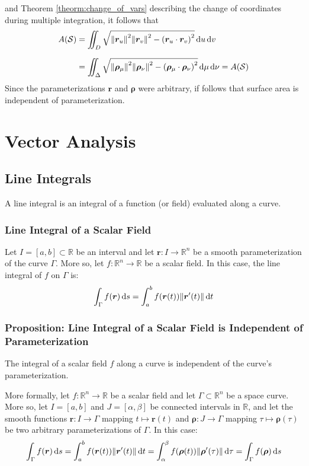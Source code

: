\documentclass[11pt, a4paper]{article}
\newcommand{\diff}{\mathop{}\!\mathrm{d}} %
\begin{document}
and Theorem \ref{theorm:change_of_vars} describing the change of coordinates during multiple integration, it follows that
\begin{align*}
	A(\mathcal{S}) &= \iint_D \sqrt{\norm{\bm{r}_u}^2 \norm{\bm{r}_v}^2 - \left(\bm{r}_u \cdot \bm{r}_v\right)^2} \diff u \diff v \\[1.5ex]
 &=  \iint_\Delta \sqrt{\norm{\bm{\rho}_\mu}^2 \norm{\bm{\rho}_\nu}^2 - \left(\bm{\rho}_\mu \cdot \bm{\rho}_\nu\right)^2} \diff \mu \diff \nu =	A(\mathcal{S})
\end{align*}
Since the parameterizations $ \bm{r} $ and $ \bm{\rho} $ were arbitrary, if follows that surface area is independent of parameterization.
\newpage 
\section{Vector Analysis}

\subsection{Line Integrals}
A line integral is an integral of a function (or field) evaluated along a curve.
	
\subsubsection{Line Integral of a Scalar Field}
Let $ I = [a, b] \subset \mathbb{R} $ be an interval and let $ \bm{r} : I \rightarrow \mathbb{R}^n $ be a smooth parameterization of the curve $ \Gamma $. More so, let $ f : \mathbb{R}^n \rightarrow \mathbb{R} $ be a scalar field. In this case, the line integral of $ f $ on $ \Gamma $ is:
\begin{equation*}
	\int_\Gamma f(\bm{r}) \diff s = \int_{a}^{b} f(\bm{r}(t)) \norm{\bm{r}'(t)} \diff t
\end{equation*}

\subsubsection{Proposition: Line Integral of a Scalar Field is Independent of Parameterization}
The integral of a scalar field $ f $ along a curve is independent of the curve's parameterization. 

More formally, let $ f : \mathbb{R}^n \rightarrow \mathbb{R} $ be a scalar field and let $ \Gamma \subset \mathbb{R}^n$ be a space curve. More so, let $ I = [a, b] $ and $ J = [\alpha, \beta]$ be connected intervals in $ \mathbb{R} $, and let the smooth functions $ \bm{r} : I \rightarrow \Gamma $ mapping $ t \mapsto \bm{r}(t) $ and $ \bm{\rho} : J \rightarrow \Gamma $ mapping $ \tau \mapsto \bm{\rho}(\tau) $ be two arbitrary parameterizations of $ \Gamma $. In this case:
\begin{equation*}
	\int_\Gamma f(\bm{r}) \diff s = \int_{a}^{b} f(\bm{r}(t)) \norm{\bm{r}'(t)} \diff t = \int_{\alpha}^{\beta} f(\bm{\rho}(t)) \norm{\bm{\rho}'(\tau)} \diff \tau = \int_\Gamma f(\bm{\rho}) \diff s
\end{equation*}
	
\end{document}

